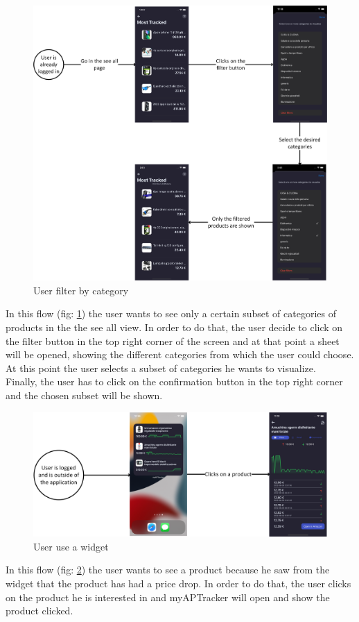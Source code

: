 \begin{figure}[h!]
        \centering
        \includegraphics[scale=0.14]{images/interfaces/user_filter_category.png}
        \caption{User filter by category}
        \label{fig:user_filter_category}
\end{figure}
\FloatBarrier
In this flow (fig: \ref{fig:user_filter_category}) the user wants to see only a certain subset of categories of products in the the see all view. In order to do that, the user decide to click on the filter button in the top right corner of the screen and at that point a sheet will be opened, showing the different categories from which the user could choose.\\
At this point the user selects a subset of categories he wants to visualize.\\
Finally, the user has to click on the confirmation button in the top right corner and the chosen subset will be shown.

\begin{figure}[h!]
        \centering
        \includegraphics[scale=0.14]{images/interfaces/user_use_widget.png}
        \caption{User use a widget}
        \label{fig:user_use_widget}
\end{figure}
\FloatBarrier
In this flow (fig: \ref{fig:user_use_widget}) the user wants to see a product because he saw from the widget that the product has had a price drop. In order to do that, the user clicks on the product he is interested in and myAPTracker will open and show the product clicked.


